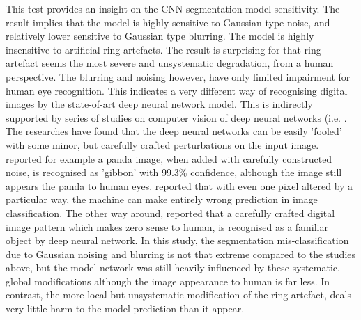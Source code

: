 \documentclass[draft,linenumbers]{agujournal2018}
\begin{document}
 This test provides an insight on the CNN segmentation model sensitivity. The result implies that the model is highly sensitive to Gaussian type noise, and relatively lower sensitive to Gaussian type blurring. The model is highly insensitive to artificial ring artefacts. The result is surprising for that ring artefact seems the most severe and unsystematic degradation, from a human perspective. The blurring and noising however, have only limited impairment for human eye recognition. This indicates a very different way of recognising digital images by the state-of-art deep neural network model. This is indirectly supported by series of studies on computer vision of deep neural networks (i.e. \citet{nguyen2015deep, goodfellow2014explaining,su2019one}. The researches have found that the deep neural networks can be easily 'fooled' with some minor, but carefully crafted perturbations on the input image. \citet{goodfellow2014explaining} reported for example a panda image, when added with carefully constructed noise, is recognised as 'gibbon' with 99.3\% confidence, although the image still appears the panda to human eyes. \citet{su2019one} reported that with even one pixel altered by a particular way, the machine can make entirely wrong prediction in image classification. The other way around, \citet{nguyen2015deep} reported that a carefully crafted digital image pattern which makes zero sense to human, is recognised as a familiar object by deep neural network. In this study, the segmentation mis-classification due to Gaussian noising and blurring is not that extreme compared to the studies above, but the model network was still heavily influenced by these systematic, global modifications although the image appearance to human is far less. In contrast, the more local but unsystematic modification of the ring artefact, deals very little harm to the model prediction than it appear.
 
\end{document}
